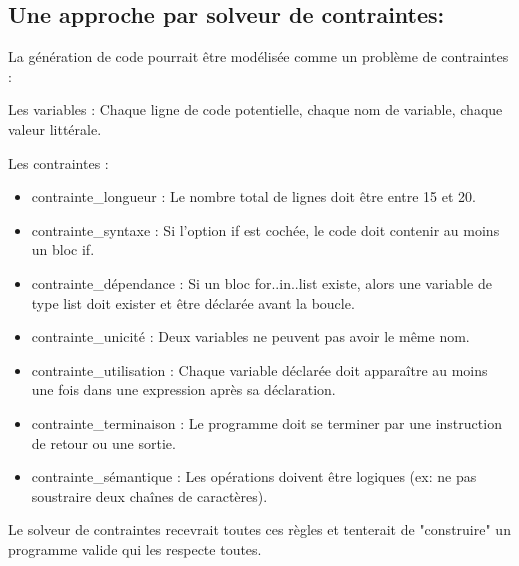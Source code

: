 \documentclass[a4paper, 11pt]{article}
\begin{document}
\subsection{Une approche par solveur de contraintes:}
La génération de code pourrait être modélisée comme un problème de contraintes :

Les variables : Chaque ligne de code potentielle, chaque nom de variable, chaque valeur littérale.

Les contraintes : 
\begin{itemize}
    \item contrainte\_longueur : Le nombre total de lignes doit être entre 15 et 20.
    \item contrainte\_syntaxe : Si l'option if est cochée, le code doit contenir au moins un bloc if.
    \item contrainte\_dépendance : Si un bloc for..in..list existe, alors une variable de type list doit exister et être déclarée avant la boucle.
    \item contrainte\_unicité : Deux variables ne peuvent pas avoir le même nom.
    \item contrainte\_utilisation : Chaque variable déclarée doit apparaître au moins une fois dans une expression après sa déclaration.
    \item contrainte\_terminaison : Le programme doit se terminer par une instruction de retour ou une sortie.
    \item contrainte\_sémantique : Les opérations doivent être logiques (ex: ne pas soustraire deux chaînes de caractères).
\end{itemize}
Le solveur de contraintes recevrait toutes ces règles et tenterait de "construire" un programme valide qui les respecte toutes.
\end{document}
